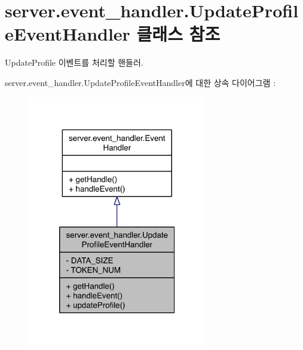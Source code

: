\hypertarget{classserver_1_1event__handler_1_1_update_profile_event_handler}{\section{server.\-event\-\_\-handler.\-Update\-Profile\-Event\-Handler 클래스 참조}
\label{classserver_1_1event__handler_1_1_update_profile_event_handler}
}


Update\-Profile 이벤트를 처리할 핸들러.  




server.\-event\-\_\-handler.\-Update\-Profile\-Event\-Handler에 대한 상속 다이어그램 \-: \nopagebreak
\begin{figure}[H]
\begin{center}
\leavevmode
\includegraphics[width=222pt]{classserver_1_1event__handler_1_1_update_profile_event_handler__inherit__graph}
\end{center}
\end{figure}


